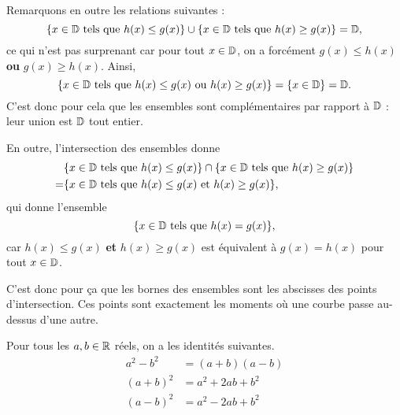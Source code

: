 {		Remarquons en outre les relations suivantes :
			\[ \{ x \in \mathbb{D} \text{ tels que } h(x) \leq g(x) \} \cup \{ x \in \mathbb{D} \text{ tels que } h(x) \geq g(x) \} = \mathbb{D}, \]
		ce qui n'est pas  surprenant car pour tout $x\in\mathbb{D}$, on a forcément $g(x) \leq h(x)$ \textbf{ou} $g(x) \geq h(x)$. 
		Ainsi, 
			\[ \{ x \in \mathbb{D} \text{ tels que } h(x) \leq g(x) \text{ ou }  h(x) \geq g(x) \}  = \{ x \in \mathbb{D} \} = \mathbb{D}. \]
		C'est donc pour cela que les ensembles sont complémentaires par rapport à $\mathbb{D}$ : leur union est $\mathbb{D}$ tout entier.
		
		En outre, l'intersection des ensembles donne
			\begin{align*}
			 & \{ x \in \mathbb{D} \text{ tels que } h(x) \leq g(x) \} \cap \{ x \in \mathbb{D} \text{ tels que } h(x) \geq g(x) \} \\
			 =& \{ x \in \mathbb{D} \text{ tels que } h(x) \leq g(x) \text{ et } h(x) \geq g(x) \},
			 \end{align*}
		qui donne l'ensemble
			\[ \{ x \in \mathbb{D} \text{ tels que } h(x) = g(x) \}, \]
		car $h(x) \leq g(x)$ \textbf{et} $h(x) \geq g(x)$ est équivalent à $g(x) = h(x)$ pour tout $x\in\mathbb{D}$.
		
		C'est donc pour ça que les bornes des ensembles sont les abscisses des points d'intersection.
		Ces points sont exactement les moments où une courbe passe au-dessus d'une autre.
	}
	
	
	\begin{theorem*}
		Pour tous les $a,b\in\mathbb{R}$ réels, on a les identités suivantes.
			\begin{align*}
				a^2 - b^2 &= (a+b)(a-b) \\
				(a+b)^2 &= a^2 + 2ab + b^2 \\
				(a-b)^2 &= a^2 - 2ab + b^2
			\end{align*}
	\end{theorem*}


